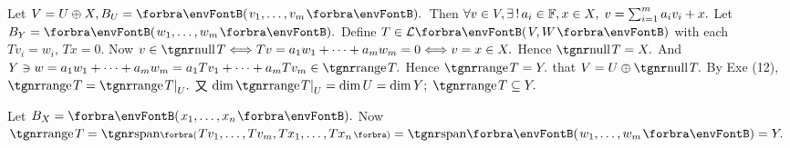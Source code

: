 Let $V=U\oplus X,B_U=\Par{v_1,\dots,v_m}.$ \,Then $\forall v\in V,\exists\,!\,a_i\in{\mathbb{F}},x\in X,\;v=\sum_{i=1}^m a_i v_i+x.$\parSol{}
Let $B_Y=\Par{w_1,\dots,w_m}.$ Define $T\in\Lm{V,W}$ with each $T{v_i}=w_i,\,Tx=0.$\parSol{}
Now $v\in\null T\Longleftrightarrow Tv=a_1w_1+\dots+a_mw_m=0\Longleftrightarrow v=x\in X.$ \;Hence $\null T=X.$\parSol{}
And $Y\ni w=a_1 w_1+\dots+a_m w_m=a_1 Tv_1+\dots+a_m Tv_m\in\range T.$ \;Hence $\range T=Y.$\parSol{}
\Or \NOTICE that $V=U\oplus\null T.$ By Exe (12), $\range T=\range T\mmid_U.$\parSol{}
{\Blind{\Or}}又 $\dim\range T\mmid_U=\dim U=\dim Y;\;\range T\subseteq Y.$\par\quad
\Or Let $B_X=\Par{x_1,\dots,x_n}.$ Now $\range T=\Span[\BigPar]{Tv_1,\dots,Tv_m,Tx_1,\dots,Tx_n}=\Span{w_1,\dots,w_m}=Y.$\PfEnd
\SepLine


